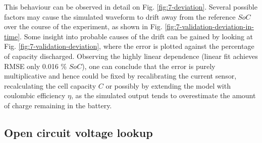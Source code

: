 This behaviour can be observed in detail on Fig. \ref{fig:7-deviation}. Several possible factors may cause the simulated waveform to drift away from the reference $SoC$ over the course of the experiment, as shown in Fig. \ref{fig:7-validation-deviation-in-time}. Some insight into probable causes of the drift can be gained by looking at Fig. \ref{fig:7-validation-deviation}, where the error is plotted against the percentage of capacity discharged. Observing the highly linear dependence (linear fit achieves RMSE only 0.016 \% $SoC$), one can conclude that the error is purely multiplicative and hence could be fixed by recalibrating the current sensor, recalculating the cell capacity $C$ or possibly by extending the model with coulombic efficiency $\eta$, as the simulated output tends to overestimate the amount of charge remaining in the battery.

\subsection{Open circuit voltage lookup}
\label{sec:7-ocv}

